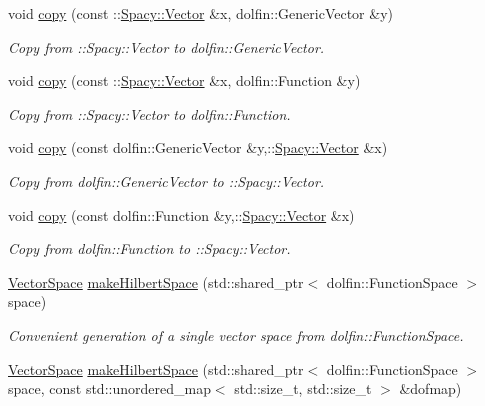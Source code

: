 \begin{DoxyCompactItemize}
void \hyperlink{group__FenicsGroup_ga7f43f0c660d0646adb031b453c536bb0}{copy} (const \+::\hyperlink{classSpacy_1_1Vector}{Spacy\+::\+Vector} \&x, dolfin\+::\+Generic\+Vector \&y)
\begin{DoxyCompactList}\small\item\em Copy from \+:\+:Spacy\+:\+:Vector to dolfin\+::\+Generic\+Vector. \end{DoxyCompactList}\item 
void \hyperlink{group__FenicsGroup_ga28fb1ebae29e07ec0256bb2331599aa7}{copy} (const \+::\hyperlink{classSpacy_1_1Vector}{Spacy\+::\+Vector} \&x, dolfin\+::\+Function \&y)
\begin{DoxyCompactList}\small\item\em Copy from \+:\+:Spacy\+:\+:Vector to dolfin\+::\+Function. \end{DoxyCompactList}\item 
void \hyperlink{group__FenicsGroup_ga61c5e45dbb789c155fbf86f8ec288f17}{copy} (const dolfin\+::\+Generic\+Vector \&y,\+::\hyperlink{classSpacy_1_1Vector}{Spacy\+::\+Vector} \&x)
\begin{DoxyCompactList}\small\item\em Copy from dolfin\+::\+Generic\+Vector to \+:\+:Spacy\+:\+:Vector. \end{DoxyCompactList}\item 
void \hyperlink{namespaceSpacy_1_1FEniCS_a7c4519bd0cbdc4e72b71f273bade591e}{copy} (const dolfin\+::\+Function \&y,\+::\hyperlink{classSpacy_1_1Vector}{Spacy\+::\+Vector} \&x)
\begin{DoxyCompactList}\small\item\em Copy from dolfin\+::\+Function to \+:\+:Spacy\+:\+:Vector. \end{DoxyCompactList}\item 
\hyperlink{classSpacy_1_1VectorSpace}{Vector\+Space} \hyperlink{group__FenicsGroup_ga8b67cb3d0188d2398625595b79e2fa6a}{make\+Hilbert\+Space} (std\+::shared\+\_\+ptr$<$ dolfin\+::\+Function\+Space $>$ space)
\begin{DoxyCompactList}\small\item\em Convenient generation of a single vector space from dolfin\+::\+Function\+Space. \end{DoxyCompactList}\item 
\hyperlink{classSpacy_1_1VectorSpace}{Vector\+Space} \hyperlink{group__FenicsGroup_ga135620ce224178541cae896577f438dc}{make\+Hilbert\+Space} (std\+::shared\+\_\+ptr$<$ dolfin\+::\+Function\+Space $>$ space, const std\+::unordered\+\_\+map$<$ std\+::size\+\_\+t, std\+::size\+\_\+t $>$ \&dofmap)

\end{DoxyCompactItemize}
